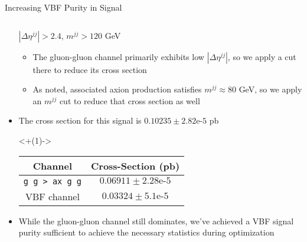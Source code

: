 \documentclass[]{beamer}
\begin{document}
\begin{frame}{Increasing VBF Purity in Signal}
\begin{columns}
\begin{column}{0.45\linewidth}
\begin{block}
\begin{itemize}[<+(1)->]
                    $|\Delta \eta^{jj}| > 2.4$, $m^{jj} > 120$ GeV
                    \begin{itemize}[<+(1)->]
                        \item The gluon-gluon channel primarily exhibits low $|\Delta \eta^{jj}|$, so we apply a cut there to reduce its cross section
                        \item As noted, associated axion production satisfies $m^{jj} \approx 80$ GeV, so we apply an $m^{jj}$ cut to reduce that cross section as well
                    \end{itemize}
                    \item The cross section for this signal is $0.10235 \pm 2.82\text{e-}5$ pb
                    \begin{center}
                        \uncover<+(1)->{
                            \begin{tabular}{|c|c|}
                                \hline
                                Channel & Cross-Section (pb) \\
                                \hline
                                \hline
                                \texttt{g g > ax g g} & $0.06911 \pm 2.28\text{e-}5$\\
                                VBF channel & $0.03324 \pm 5.1\text{e-}5$\\
                                \hline
                            \end{tabular}
                        }
                    \end{center}
                    \item While the gluon-gluon channel still dominates, we've achieved a VBF signal purity sufficient to achieve the necessary statistics during optimization 
                \end{itemize}
            \end{block}
        \end{column}
    \end{columns}
\end{frame}
\end{document}
